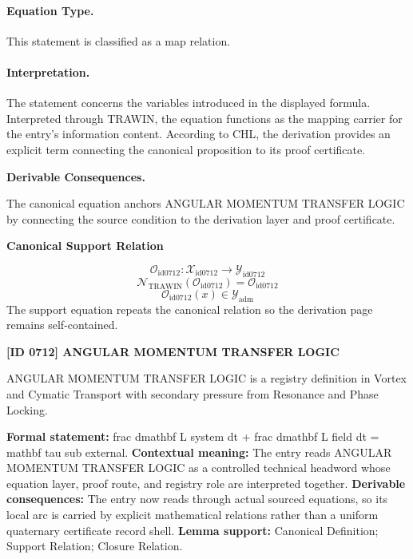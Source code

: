 \paragraph{Equation Type.}
This statement is classified as a map relation.

\paragraph{Interpretation.}
The statement concerns the variables introduced in the displayed formula. Interpreted through TRAWIN, the equation functions as the mapping carrier for the entry’s information content. According to CHL, the derivation provides an explicit term connecting the canonical proposition to its proof certificate.

\par\vspace{0.35em}
\noindent\textbf{Derivable Consequences.}\quad
\begingroup
\footnotesize
\raggedright
The canonical equation anchors ANGULAR MOMENTUM TRANSFER LOGIC by connecting the source condition to the derivation layer and proof certificate.
\par\endgroup

\noindent\textbf{Canonical Support Relation}\par
\[
\mathcal{O}_{\mathrm{id0712}}:\mathcal{X}_{\mathrm{id0712}}\longrightarrow\mathcal{Y}_{\mathrm{id0712}}
\]
\[
\mathcal{N}_{\mathrm{TRAWIN}}(\mathcal{O}_{\mathrm{id0712}})=\mathcal{O}_{\mathrm{id0712}}
\]
\[
\mathcal{O}_{\mathrm{id0712}}(x)\in\mathcal{Y}_{\mathrm{adm}}
\]
\noindent The support equation repeats the canonical relation so the derivation page remains self-contained.\par

\clearpage
\noindent\textbf{[ID 0712] ANGULAR MOMENTUM TRANSFER LOGIC}\par
\vspace{0.35em}
\begingroup\small
{}
ANGULAR MOMENTUM TRANSFER LOGIC is a registry definition in Vortex and Cymatic Transport with secondary pressure from Resonance and Phase Locking.

\begingroup\footnotesize\setlength{\emergencystretch}{3em}\sloppy
\textbf{Formal statement:} frac dmathbf L system dt + frac dmathbf L field dt = mathbf tau sub external. \textbf{Contextual meaning:} The entry reads ANGULAR MOMENTUM TRANSFER LOGIC as a controlled technical headword whose equation layer, proof route, and registry role are interpreted together. \textbf{Derivable consequences:} The entry now reads through actual sourced equations, so its local arc is carried by explicit mathematical relations rather than a uniform quaternary certificate record shell. \textbf{Lemma support:} Canonical Definition; Support Relation; Closure Relation.\par
\endgroup

